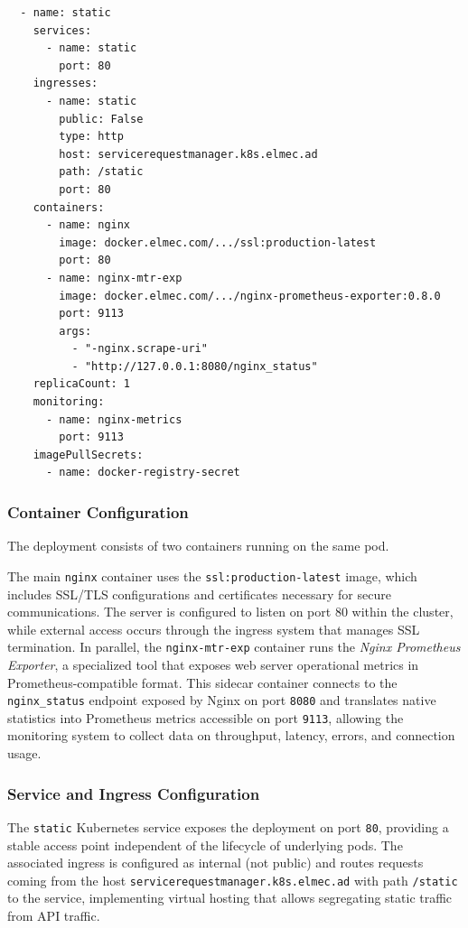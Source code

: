 \begin{verbatim}
  - name: static
    services:
      - name: static
        port: 80
    ingresses:
      - name: static
        public: False
        type: http
        host: servicerequestmanager.k8s.elmec.ad
        path: /static
        port: 80
    containers:
      - name: nginx
        image: docker.elmec.com/.../ssl:production-latest
        port: 80
      - name: nginx-mtr-exp
        image: docker.elmec.com/.../nginx-prometheus-exporter:0.8.0
        port: 9113
        args:
          - "-nginx.scrape-uri"
          - "http://127.0.0.1:8080/nginx_status"
    replicaCount: 1
    monitoring:
      - name: nginx-metrics
        port: 9113
    imagePullSecrets:
      - name: docker-registry-secret
\end{verbatim}

\subsubsection{Container Configuration}
The deployment consists of two containers running on the same pod.

The main \texttt{nginx} container uses the \texttt{ssl:production-latest} image, which includes SSL/TLS configurations and certificates necessary for secure communications. The server is configured to listen on port 80 within the cluster, while external access occurs through the ingress system that manages SSL termination.
In parallel, the \texttt{nginx-mtr-exp} container runs the \textit{Nginx Prometheus Exporter}, a specialized tool that exposes web server operational metrics in Prometheus-compatible format. This sidecar container connects to the \texttt{nginx\_status} endpoint exposed by Nginx on port \texttt{8080} and translates native statistics into Prometheus metrics accessible on port \texttt{9113}, allowing the monitoring system to collect data on throughput, latency, errors, and connection usage.

\subsubsection{Service and Ingress Configuration}
The \texttt{static} Kubernetes service exposes the deployment on port \texttt{80}, providing a stable access point independent of the lifecycle of underlying pods. The associated ingress is configured as internal (not public) and routes requests coming from the host \texttt{servicerequestmanager.k8s.elmec.ad} with path \texttt{/static} to the service, implementing virtual hosting that allows segregating static traffic from API traffic.

